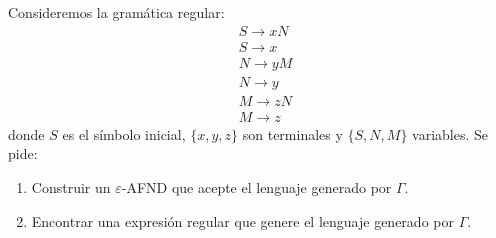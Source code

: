 \documentclass[twoside]{article}
\begin{document}
\begin{ejercicio}{13}
Consideremos la gramática regular:
\begin{align*}
&S \rightarrow xN\\
&S \rightarrow x\\
&N \rightarrow yM\\
&N \rightarrow y\\
&M \rightarrow zN\\
&M \rightarrow z
\end{align*}
donde $S$ es el símbolo inicial, $\{x, y, z\}$ son terminales y $\{S,N,M\}$ variables. Se pide:
\begin{enumerate}
\item Construir un $\varepsilon$-AFND que acepte el lenguaje generado por $\Gamma$.
\item Encontrar una expresión regular que genere el lenguaje generado por $\Gamma$.
\end{enumerate}
\end{ejercicio}
\end{document}
